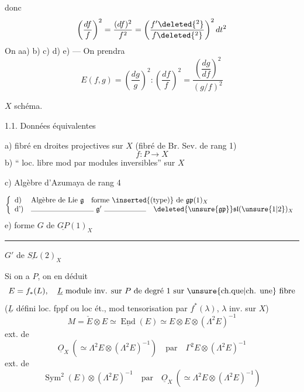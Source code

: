 
donc
\[
\left(\frac{df}{f}\right)^2=\frac{(df)^2}{f^2}
=\left(\frac{f'\deleted{^{2}}}{f\deleted{^{2}}}\right)^2dt^2
\]
On a\quad a) b) c) d) e) --- On prendra
\[
E(f,g)=\left(\frac{dg}{g}\right)^2:
\left(\frac{df}{f}\right)^2
=\frac{\left(\dfrac{dg}{df}\right)^2}{(g/f)^2}
\]


$X$ schéma.

1.1. Données équivalentes

a) fibré en droites projectives  sur $X$
(fibré de Br. Sev. de rang 1)
\[
f:P\longrightarrow X
\]
b) `` loc. libre 
mod  par
modules inversibles'' sur $X$

c) Algèbre d'Azumaya  de rang 4

\[
\left\{\begin{array}{ll}
\text{d)}&\text{Algèbre de Lie }\mathfrak g\quad
\text{forme }\inserted{\text{(type)}}\text{ de }\mathfrak{gp}(1)_X\\
\text{d')}&\rule{3cm}{.3pt}\ \mathfrak g'\ \rule{2cm}{.3pt}\quad
\deleted{\unsure{\mathfrak{gp}}}\mathfrak{sl}(\unsure{1|2})_X
\end{array}\right.
\]
e) forme $G$ de $\underline{GP}(1)_X$

 
\rule{1cm}{.3pt} $G'$ de $\underline{SL}(2)_X$

Si on a $P$, on en déduit
\[
E=f_*(L),\quad \underline L\text{ module inv. sur }P
\text{ de degré 1 sur \unsure{ch.que|ch. une} fibre}
\]
($\underline L$ défini loc. fppf  ou loc ét., mod
tensorisation par $f^*(\lambda)$, $\lambda$ inv. sur $X$)
\[
M=\check E\otimes E\simeq\underline{\operatorname{End}}(E)
\simeq E\otimes E\otimes(\Lambda^2E)^{-1}
\]
ext. de
\[
\underline O_X\ (\simeq\Lambda^2E\otimes(\Lambda^2E)^{-1})
\quad\text{par}\quad\Gamma^2E\otimes(\Lambda^2E)^{-1}
\]
ext. de
\[
\operatorname{Sym}^2(E)\otimes(\Lambda^2E)^{-1}
\quad\text{par}\quad\underline O_X\ (\simeq\Lambda^2E\otimes(\Lambda^2E)^{-1})
\]

